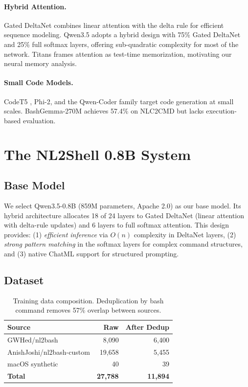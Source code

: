\documentclass[11pt,a4paper]{article}
\begin{document}
\paragraph{Hybrid Attention.}
Gated DeltaNet \cite{ali2024} combines linear attention with the delta rule for efficient sequence modeling.
Qwen3.5 \cite{qwen2025} adopts a hybrid design with 75\% Gated DeltaNet and 25\% full softmax layers, offering sub-quadratic complexity for most of the network.
Titans \cite{sun2025} frames attention as test-time memorization, motivating our neural memory analysis.

\paragraph{Small Code Models.}
CodeT5 \cite{wang2021}, Phi-2, and the Qwen-Coder family target code generation at small scales.
BashGemma-270M achieves 57.4\% on NLC2CMD but lacks execution-based evaluation.

\section{The NL2Shell 0.8B System}

\subsection{Base Model}

We select Qwen3.5-0.8B (859M parameters, Apache 2.0) as our base model.
Its hybrid architecture allocates 18 of 24 layers to Gated DeltaNet (linear attention with delta-rule updates) and 6 layers to full softmax attention.
This design provides:
(1) \emph{efficient inference} via $O(n)$ complexity in DeltaNet layers,
(2) \emph{strong pattern matching} in the softmax layers for complex command structures, and
(3) native ChatML support for structured prompting.

\subsection{Dataset}

\begin{table}[t]
\centering
\small
\begin{tabular}{lrr}
\toprule
\textbf{Source} & \textbf{Raw} & \textbf{After Dedup} \\
\midrule
GWHed/nl2bash & 8{,}090 & 6{,}400 \\
AnishJoshi/nl2bash-custom & 19{,}658 & 5{,}455 \\
macOS synthetic & 40 & 39 \\
\midrule
\textbf{Total} & \textbf{27{,}788} & \textbf{11{,}894} \\
\bottomrule
\end{tabular}
\caption{Training data composition. Deduplication by bash command removes 57\% overlap between sources.}
\label{tab:dataset}
\end{table}
\end{document}
